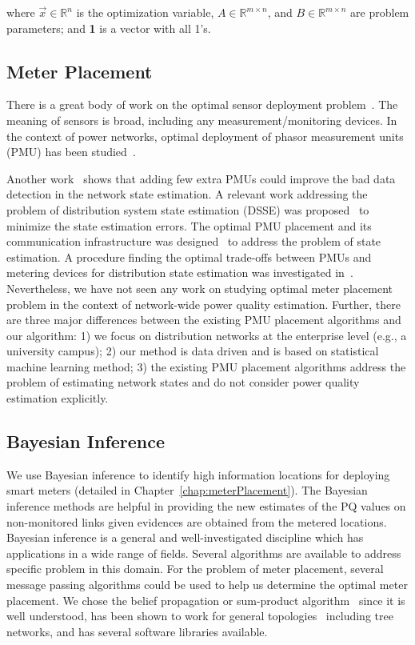 where $\vec{x}\in \mathbb{R}^n$ is the optimization variable, $A \in \mathbb{R}^{m \times n}$, and $B \in \mathbb{R}^{m \times n}$ are problem parameters;  and \textbf{1} is a vector with all 1's.

\subsection{Meter Placement}
There is a great body of work on the optimal sensor deployment problem~\cite{Krause09}. The meaning of sensors is broad, including any measurement/monitoring devices. In the context of power networks, optimal deployment of phasor measurement units (PMU) has been studied~\cite{Yuill11}. 


Another work~\cite{chen2006placement} shows that adding few extra PMUs could improve the bad data detection in the network state estimation. A relevant work addressing the problem of distribution system state estimation (DSSE) was proposed~\cite{singh2011meter} to minimize the state estimation errors. The optimal PMU placement and its communication infrastructure was designed~\cite{shahraeini2012co} to address the problem of state estimation. A procedure finding the optimal trade-offs between PMUs and metering devices for distribution state estimation was investigated in~\cite{liu2012trade}. Nevertheless, we have not seen any work on studying optimal meter placement problem in the context of network-wide power quality estimation. Further, there are three major differences between the existing PMU placement algorithms and our algorithm: 1) we focus on distribution networks at the enterprise level (e.g., a university campus); 2) our method is data driven and is based on statistical machine learning method; 3) the existing PMU placement algorithms address the problem of estimating network states and do not consider power quality estimation explicitly.

\subsection{Bayesian Inference}
We use Bayesian inference to identify high information locations for deploying smart meters (detailed in Chapter~\ref{chap:meterPlacement}). The Bayesian inference methods are helpful in providing the new estimates of the PQ values on non-monitored links given evidences are obtained from the metered locations. Bayesian inference is a general and well-investigated discipline which has applications in a wide range of fields. Several algorithms are available to address specific problem in this domain. For the problem of meter placement, several message passing algorithms could be used to
help us determine the optimal meter placement. We chose the belief propagation or sum-product algorithm~\cite{pearl1988probabilistic} since it is well understood, has been shown to work for general topologies~\cite{yedidia2001generalized} including tree networks, and has several software libraries available.

